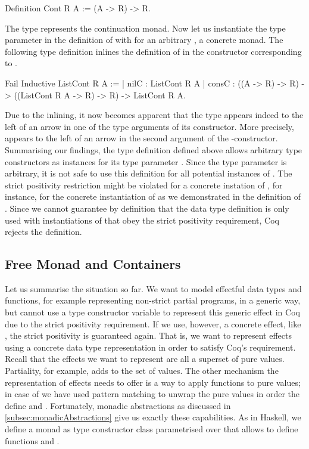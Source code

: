 \begin{coqcode}
Definition Cont R A := (A -> R) -> R.
\end{coqcode}

The type  represents the continuation monad.
Now let us instantiate the type parameter  in the definition of  with  for an arbitrary , a concrete monad.
The following type definition  inlines the definition of  in the constructor corresponding to .

\begin{coqcode}
Fail Inductive ListCont R A :=
| nilC  : ListCont R A
| consC : ((A -> R) -> R) -> ((ListCont R A -> R) -> R) -> ListCont R A.
\end{coqcode}

Due to the inlining, it now becomes apparent that the type  appears indeed to the left of an arrow in one of the type arguments of its constructor.
More precisely,  appears to the left of an arrow in the second argument of the \--constructor.
Summarising our findings, the type definition  defined above allows arbitrary type constructors as instances for its type parameter .
Since the type parameter is arbitrary, it is not safe to use this definition for all potential instances of .
The strict positivity restriction might be violated for a concrete instation of , for instance, for the concrete instantiation of  as we demonstrated in the definition of .
Since we cannot guarantee by definition that the data type definition  is only used with instantiations of  that obey the strict positivity requirement, Coq rejects the definition.

\subsection{Free Monad and Containers}
\label{subsec:freeAndContainers}

Let us summarise the situation so far.
We want to model effectful data types and functions, for example representing non\--strict partial programs, in a generic way, but cannot use a type constructor variable to represent this generic effect in Coq due to the strict positivity requirement.
If we use, however, a concrete effect, like , the strict positivity is guaranteed again.
That is, we want to represent effects using a concrete data type representation in order to satisfy Coq's requirement.
Recall that the effects we want to represent are all a superset of pure values.
Partiality, for example, adds  to the set of  values.
The other mechanism the representation of effects needs to offer is a way to apply functions to pure values; in case of  we have used pattern matching to unwrap the pure values in order the define  and .
Fortunately, monadic abstractions as discussed in \autoref{subsec:monadicAbstractions} give us exactly these capabilities.
As in Haskell, we define a monad as type constructor class parametrised over  that allows to define functions  and .

